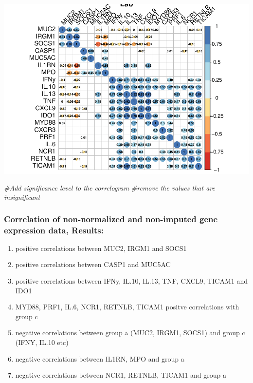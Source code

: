 \documentclass[
]{article}
\newenvironment{Shaded}{\begin{snugshade}}{\end{snugshade}}
\newcommand{\CommentTok}[1]{\textcolor[rgb]{0.56,0.35,0.01}{\textit{#1}}}
\providecommand{\tightlist}{%
  \setlength{\itemsep}{0pt}\setlength{\parskip}{0pt}}
\begin{document}
\includegraphics{Testing_normalization_imputation_order_files/figure-latex/unnamed-chunk-4-1.pdf}

\begin{Shaded}
\begin{Highlighting}[]
  \CommentTok{\#Add significance level to the correlogram}
\CommentTok{\#remove the values that are insignificant}
\end{Highlighting}
\end{Shaded}

\hypertarget{correlation-of-non-normalized-and-non-imputed-gene-expression-data-results}{%
\subsubsection{Correlation of non-normalized and non-imputed gene
expression data,
Results:}\label{correlation-of-non-normalized-and-non-imputed-gene-expression-data-results}}

\begin{enumerate}
\def\labelenumi{\alph{enumi}.}
\tightlist
\item
  positive correlations between MUC2, IRGM1 and SOCS1
\item
  positive correlations between CASP1 and MUC5AC
\item
  positive correlations between IFNy, IL.10, IL.13, TNF, CXCL9, TICAM1
  and IDO1
\item
  MYD88, PRF1, IL.6, NCR1, RETNLB, TICAM1 positve correlations with
  group c
\item
  negative correlations between group a (MUC2, IRGM1, SOCS1) and group c
  (IFNY, IL.10 etc)
\item
  negative correlations between IL1RN, MPO and group a
\item
  negative correlations between NCR1, RETNLB, TICAM1 and group a
\end{enumerate}
\end{document}
